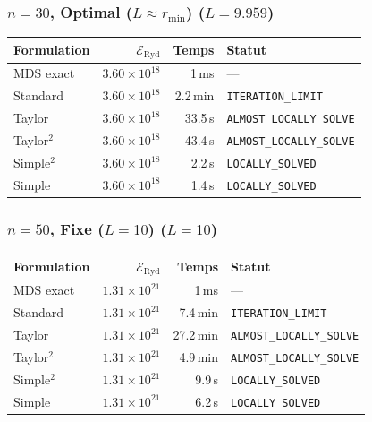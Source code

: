 \subsubsection{$n=30$, Optimal ($L{\approx}r_{\min}$) ($L=9.959$)}
\begin{longtable}{@{}lrrl@{}}
  \toprule
  Formulation & $\mathcal{E}_{\mathrm{Ryd}}$ & Temps & Statut \\
  \midrule
  \endhead
  MDS exact & $3.60\times10^{18}$ & 1\,ms & --- \\
  Standard & $3.60\times10^{18}$ & 2.2\,min & \texttt{ITERATION\_LIMIT} \\
  Taylor & $3.60\times10^{18}$ & 33.5\,s & \texttt{ALMOST\_LOCALLY\_SOLVE} \\
  Taylor$^2$ & $3.60\times10^{18}$ & 43.4\,s & \texttt{ALMOST\_LOCALLY\_SOLVE} \\
  Simple$^2$ & $3.60\times10^{18}$ & 2.2\,s & \texttt{LOCALLY\_SOLVED} \\
  Simple & $3.60\times10^{18}$ & 1.4\,s & \texttt{LOCALLY\_SOLVED} \\
  \bottomrule
\end{longtable}

\subsubsection{$n=50$, Fixe ($L{=}10$) ($L=10$)}
\begin{longtable}{@{}lrrl@{}}
  \toprule
  Formulation & $\mathcal{E}_{\mathrm{Ryd}}$ & Temps & Statut \\
  \midrule
  \endhead
  MDS exact & $1.31\times10^{21}$ & 1\,ms & --- \\
  Standard & $1.31\times10^{21}$ & 7.4\,min & \texttt{ITERATION\_LIMIT} \\
  Taylor & $1.31\times10^{21}$ & 27.2\,min & \texttt{ALMOST\_LOCALLY\_SOLVE} \\
  Taylor$^2$ & $1.31\times10^{21}$ & 4.9\,min & \texttt{ALMOST\_LOCALLY\_SOLVE} \\
  Simple$^2$ & $1.31\times10^{21}$ & 9.9\,s & \texttt{LOCALLY\_SOLVED} \\
  Simple & $1.31\times10^{21}$ & 6.2\,s & \texttt{LOCALLY\_SOLVED} \\
  \bottomrule
\end{longtable}

